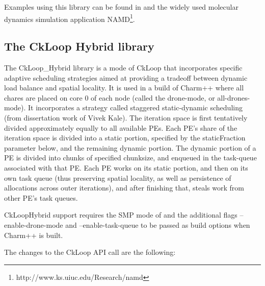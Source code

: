 Examples using this library can be found in  and the
widely used molecular dynamics simulation application
NAMD\footnote{http://www.ks.uiuc.edu/Research/namd}.

\subsection{The CkLoop Hybrid library}
The CkLoop\_Hybrid library is a mode of CkLoop that incorporates specific
adaptive scheduling strategies aimed at providing a tradeoff between dynamic
load balance and spatial locality. It is used in a build of Charm++ where all
chares are placed on core 0 of each node (called the drone-mode, or
all-drones-mode). It incorporates a strategy called staggered static-dynamic
scheduling (from dissertation work of Vivek Kale). The iteration space is
first tentatively divided approximately equally to all available PEs. Each
PE's share of the iteration space is divided into a static portion, specified by
the staticFraction parameter below, and the remaining dynamic portion. The dynamic
portion of a PE is divided into chunks of specified chunksize, and enqueued in
the task-queue associated with that PE. Each PE works on its static portion,
and then on its own task queue (thus preserving spatial locality, as well as
persistence of allocations across outer iterations), and after finishing that,
steals work from other PE’s task queues.

CkLoopHybrid support requires the SMP mode of \charmpp{} and the additional flags --enable-drone-mode and
--enable-task-queue to be passed as build options when Charm++ is built.

The changes to the CkLoop API call are the following:

